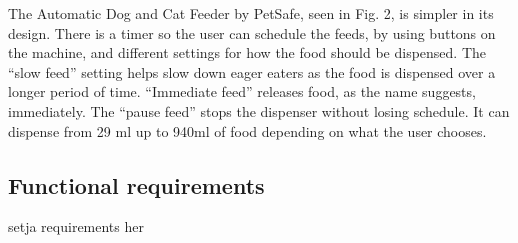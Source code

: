 \documentclass[twocolumn]{webofc}
\begin{document}
The Automatic Dog and Cat Feeder by PetSafe, seen in Fig. 2, is simpler in its design. 
There is a timer so the user can schedule the feeds, by using buttons on the machine, and different settings for how the food should be dispensed.
The “slow feed” setting helps slow down eager eaters as the food is dispensed over a longer period of time.
“Immediate feed” releases food, as the name suggests, immediately. The “pause feed” stops the dispenser without losing schedule.
It can dispense from 29 ml up to 940ml of food depending on what the user chooses.\cite{petsafe}




\subsection{Functional requirements}
setja requirements her
\end{document}
